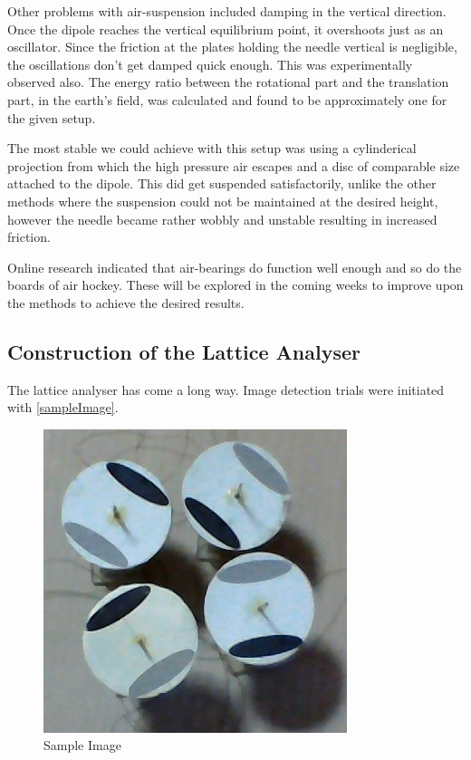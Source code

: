 \begin{enumerate}
					\par
					Other problems with air-suspension included damping in the vertical direction. Once the dipole reaches the vertical equilibrium point, it overshoots just as an oscillator. Since the friction at the plates holding the needle vertical is negligible, the oscillations don't get damped quick enough. This was experimentally observed also. The energy ratio between the rotational part and the translation part, in the earth's field, was calculated and found to be approximately one for the given setup.
					\par
					The most stable we could achieve with this setup was using a cylinderical projection from which the high pressure air escapes and a disc of comparable size attached to the dipole. This did get suspended satisfactorily, unlike the other methods where the suspension could not be maintained at the desired height, however the needle became rather wobbly and unstable resulting in increased friction.
					\par
					Online research indicated that air-bearings do function well enough and so do the boards of air hockey. These will be explored in the coming weeks to improve upon the methods to achieve the desired results.
		\end{enumerate}
	\subsection{Construction of the Lattice Analyser}
		The lattice analyser has come a long way. Image detection trials were initiated with \autoref{sampleImage}. 
		\begin{figure}[bth]
			\begin{center}
				\includegraphics[width=0.7\linewidth]{../../latticeAnalyser/picture002.jpg}
			\end{center}
		\caption[Sample Image]{Sample Image}
		\label{sampleImage}
		\end{figure}


